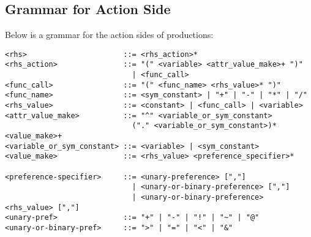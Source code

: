 \subsection{Grammar for Action Side}
\label{SYNTAX-pm-actgrammar}    %


Below is a grammar for the action sides of productions:
\begin{verbatim}
<rhs>                      ::= <rhs_action>*
<rhs_action>               ::= "(" <variable> <attr_value_make>+ ")" 
                             | <func_call>
<func_call>                ::= "(" <func_name> <rhs_value>* ")"
<func_name>                ::= <sym_constant> | "+" | "-" | "*" | "/"
<rhs_value>                ::= <constant> | <func_call> | <variable>
<attr_value_make>          ::= "^" <variable_or_sym_constant>
                             ("." <variable_or_sym_constant>)* <value_make>+
<variable_or_sym_constant> ::= <variable> | <sym_constant>
<value_make>               ::= <rhs_value> <preference_specifier>*

<preference-specifier>     ::= <unary-preference> [","]
                             | <unary-or-binary-preference> [","]
                             | <unary-or-binary-preference> <rhs_value> [","]
<unary-pref>               ::= "+" | "-" | "!" | "~" | "@"
<unary-or-binary-pref>     ::= ">" | "=" | "<" | "&"
\end{verbatim}


